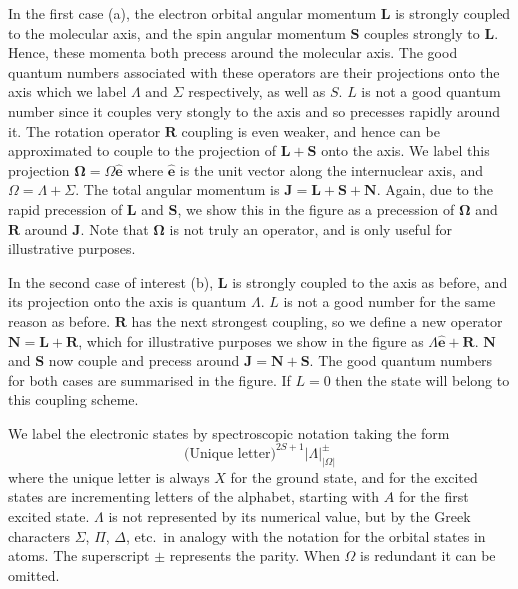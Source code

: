 In the first case (a), the electron orbital angular momentum $\mathbf{L}$ is
strongly coupled to the molecular axis, and the spin angular momentum
$\mathbf{S}$ couples strongly to $\mathbf{L}$. Hence, these momenta both
precess around the molecular axis. The good quantum numbers associated with
these operators are their projections onto the axis which we label $\Lambda$
and $\Sigma$  respectively, as well as $S$. $L$ is not a good quantum number
since it couples very stongly to the axis and so precesses rapidly around it.
%
The rotation operator $\mathbf{R}$ coupling is even weaker, and hence can be
approximated to couple to the projection of $\mathbf{L} + \mathbf{S}$ onto the
axis. We label this projection $\mathbf{\Omega} = \Omega \mathbf{\hat{e}}$
where $\mathbf{\hat{e}}$ is the unit vector along the internuclear axis, and $\Omega =
\Lambda + \Sigma$. The total angular momentum is $\mathbf{J} = \mathbf{L} +
\mathbf{S} + \mathbf{N}$. Again, due to the rapid precession of $\mathbf{L}$
and $\mathbf{S}$, we show this in the figure as a precession of
$\mathbf{\Omega}$ and $\mathbf{R}$ around $\mathbf{J}$. Note that
$\mathbf{\Omega}$ is not truly an operator, and is only useful for illustrative
purposes.

In the second case of interest (b), $\mathbf{L}$ is strongly coupled to the
axis as before, and its projection onto the axis is quantum
$\Lambda$. $L$ is not a good number for the same reason as before.
$\mathbf{R}$ has the next strongest coupling, so we define a new operator
$\mathbf{N} = \mathbf{L} + \mathbf{R}$, which for illustrative purposes we show
in the figure as $\Lambda \mathbf{\hat{e}} + \mathbf{R}$.  $\mathbf{N}$ and
$\mathbf{S}$ now couple and precess around $\mathbf{J} = \mathbf{N} +
\mathbf{S}$. The good quantum numbers for both cases are summarised in the
figure. If $L=0$ then the state will belong to this coupling scheme.

We label the electronic states by spectroscopic notation taking the form
%
\begin{equation*} 
  \text{(Unique letter)}^{2S+1}|\Lambda|^\pm_{|\Omega|}
\end{equation*}
%
where the unique letter is always $X$ for the ground state, and for the excited
states are 
incrementing letters of the alphabet, starting with $A$ for the first
excited state. $\Lambda$ is not represented by its numerical value, but
by the Greek characters $\Sigma$, $\Pi$, $\Delta$, etc.\ in analogy with the
notation for the orbital states in atoms. The superscript $\pm$ represents the
parity. When $\Omega$ is redundant it can be omitted.

